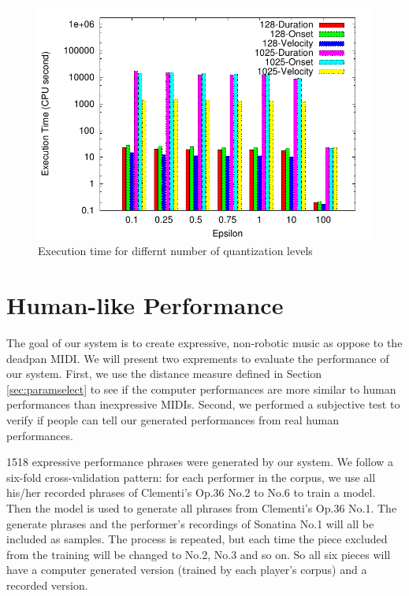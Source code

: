 \begin{figure}[tp]
   \begin{center}
      \includegraphics[width=\textwidth]{fig/quant_comp}
   \end{center}
   \caption{Execution time for differnt number of quantization levels}
   \label{fig:quant_comp}
\end{figure}

\section{Human-like Performance}
\label{sec:turing}
The goal of our system is to create expressive, non-robotic music as oppose to the deadpan MIDI. We will present two exprements to evaluate the performance of our system. First, we use the distance measure defined in Section \ref{sec:paramselect} to see if the computer performances are more similar to human performances than inexpressive MIDIs. Second, we performed a subjective test to verify if people can tell our generated performances from real human performances.

1518 expressive performance phrases were generated by our system. We follow a six-fold cross-validation pattern: for each performer in the corpus, we use all his/her recorded phrases of Clementi's Op.36 No.2 to No.6 to train a model. Then the model is used to generate all phrases from Clementi's Op.36 No.1. The generate phrases and the performer's recordings of Sonatina No.1 will all be included as samples. The process is repeated, but each time the piece excluded from the training will be changed to No.2, No.3 and so on. So all six pieces will have a computer generated version (trained by each player's corpus) and a recorded version.

